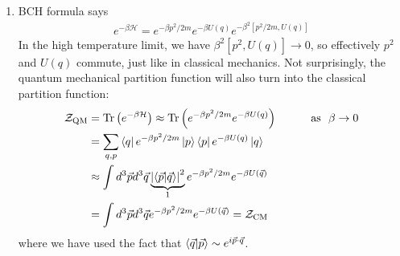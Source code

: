 \documentclass{article}
\theoremstyle{definition}
\newcommand{\ham}{\mathcal{H}}
\newcommand{\be}{\beta}
\newcommand{\lp}{\left(}
\newcommand{\rp}{\right)}
\begin{document}
\begin{enumerate}[label=(\alph*)]
	\item BCH formula says
	\begin{align*}
	e^{-\be \ham} = e^{-\be p^2/2m} e^{-\be U({q})} e^{-\be^2 [p^2/2m, U({q})]} 
	\end{align*}
	In the high temperature limit, we have $\be^2 [p^2, U({q})] \to 0$, so effectively $p^2$ and $U({q})$ commute, just like in classical mechanics. Not surprisingly, the quantum mechanical partition function will also turn into the classical partition function:
	\begin{align*}
	\mathcal{Z}_\text{QM} 
	&= \Tr\lp e^{-\be \ham}  \rp \approx  \Tr\lp e^{-\be p^2/2m} e^{-\be U({q})} \rp\quad\quad\quad \text{as  }\,\,\be \to 0 \\
	&= \sum_{{q},{p}}\bra{q} e^{-\be p^2/2m} \ket{p} \bra{p} e^{-\be U({q})} \ket{{q}}\\
	&\approx \int d^3  \vec{p} d^3 \vec{q} \underbrace{\abs{\bra{\vec{p}} \ket{\vec{q}}}^2}_{1} e^{-\be p^2/2m}  e^{-\be U(\vec{q})}\\
	&= \int d^3  \vec{p} d^3 \vec{q}  e^{-\be p^2/2m}  e^{-\be U(\vec{q})} = \mathcal{Z}_\text{CM}
	\end{align*}
	where we have used the fact that $\bra{\vec{q}}\ket{\vec{p}} \sim e^{i \vec{p}\cdot \vec{q}}$. 
	

\end{enumerate}
\end{document}

